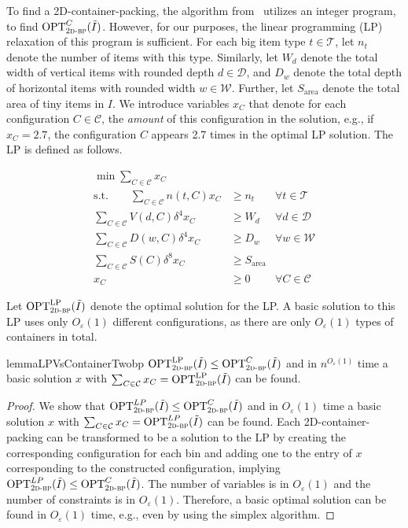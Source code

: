 \documentclass[a4paper,UKenglish,cleveref, autoref, thm-restate]{lipics-v2021}
\newcommand{\eps}{\varepsilon}
\newcommand{\opt}{\mathrm{OPT}}
\newcommand{\twobp}{\textsc{2d-bp}\xspace}
\newcommand{\bigy}{big\xspace}
\newcommand{\tin}{tiny\xspace}
\newcommand{\area}{\mathrm{area}}
\begin{document}
To find a 2D-container-packing, the algorithm from~\cite{jansen2016new} utilizes an integer program, to find $\opt_{\twobp}^{C}(\tilde{I})$. 
However, for our purposes, the linear programming (LP) relaxation of this program is sufficient.
For each \bigy item type $t \in \mathcal{T}$, let $n_t$ denote the number of items with this type. 
Similarly, let $W_d$ denote the total width of vertical items with rounded depth $d \in \mathcal{D}$, 
and $D_w$ denote the total depth of horizontal items with rounded width $w \in \mathcal{W}$. 
Further, 
let $S_{\area}$ denote the total area of \tin items in $I$.
We introduce variables $x_C$ that denote for each configuration $C \in \mathcal{C}$, the {\em amount} of this configuration in the solution, e.g., if $x_C= 2.7$, the configuration $C$ appears 2.7 times in the optimal LP solution. 
The LP is defined as follows. 

\begin{align*}
    \min \sum_{C \in \mathcal{C}} x_C\\
    \text{s.t.} \quad \quad \sum_{C \in \mathcal{C}} n(t,C)x_C &\geq  n_t &\forall t \in \mathcal{T}\\
     \sum_{C \in \mathcal{C}} V(d,C)\delta^4x_C &\geq  W_d &\forall d \in \mathcal{D}\\
    \sum_{C \in \mathcal{C}} D(w,C)\delta^4x_C &\geq  D_w &\forall w \in \mathcal{W}\\
    \sum_{C \in \mathcal{C}} S(C)\delta^8x_C &\geq  S_{\area}\\
    x_C &\geq 0 &\forall C \in \mathcal{C}
\end{align*}



Let $\opt_{\twobp}^{\text{LP}}(\tilde{I})$ denote the optimal solution for the LP. 
A basic solution to this LP uses only $O_{\eps}(1)$ different configurations, as there are only $O_{\eps}(1)$  types of containers in total.

\begin{restatable}{lemma}{LPVsContainerTwobp}
\label{lem::LP-vs-container-twobp}
$\opt_{\twobp}^{\text{LP}}(\tilde{I}) \leq \opt_{\twobp}^{C}(\tilde{I})$ and in $n^{O_{\eps}(1)}$ time a basic solution $x$ with  $\sum_{C \in \mathcal{C}} x_C = \opt_{\twobp}^{\text{LP}}(\tilde{I})$ can be found.
\end{restatable}

\begin{proof}
We show that $\opt_{\twobp}^{LP}(\tilde{I}) \leq \opt_{\twobp}^{C}(\tilde{I})$ and in $O_{\eps}(1)$ time a basic solution $x$ with  $\sum_{C \in \mathcal{C}} x_C = \opt_{\twobp}^{LP}(\tilde{I})$ can be found.
    Each 2D-container-packing can be transformed to be a solution to the LP by creating the corresponding configuration for each bin and adding one to the entry of $x$ corresponding to the constructed configuration, implying  $\opt_{\twobp}^{LP}(\tilde{I}) \leq \opt_{\twobp}^{C}(\tilde{I})$.
    The number of variables is in $O_{\eps}(1)$ and the number of constraints is in $O_{\eps}(1)$. Therefore, a basic optimal solution can be found in $O_{\eps}(1)$ time, e.g., even by using the simplex algorithm.
\end{proof}
\end{document}
